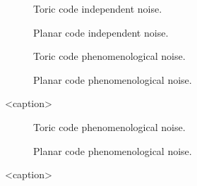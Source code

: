 \begin{figure}[htbp]
  \centering
  \begin{subfigure}[b]{0.49\textwidth}
      \begin{adjustbox}{Clip=0 1em 0 0}
        
      \end{adjustbox}
      \caption{Toric code independent noise.}
  \end{subfigure}
  \begin{subfigure}[b]{0.49\textwidth}
      \begin{adjustbox}{Clip=0 1em 0 0}
        
      \end{adjustbox}
      \caption{Planar code independent noise.}
  \end{subfigure}
  \begin{subfigure}[b]{0.49\textwidth}
      \begin{adjustbox}{Clip=0 1em 0 0}
        
      \end{adjustbox}
      \caption{Toric code phenomenological noise.}
  \end{subfigure}
  \begin{subfigure}[b]{0.49\textwidth}
      \begin{adjustbox}{Clip=0 1em 0 0}
        
      \end{adjustbox}
      \caption{Planar code phenomenological noise.}
  \end{subfigure}
  \caption{<caption>}
  \label{fig:mwcomp_uf}
\end{figure}

\begin{figure}[htbp]
  \centering
  \begin{subfigure}[b]{0.49\textwidth}
    \begin{adjustbox}{Clip=0 1em 0 0}
      
    \end{adjustbox}
    \caption{Toric code phenomenological noise.}
  \end{subfigure}
  \begin{subfigure}[b]{0.49\textwidth}
    \begin{adjustbox}{Clip=0 1em 0 0}
      
    \end{adjustbox}
    \caption{Planar code phenomenological noise.}
  \end{subfigure}
  \caption{<caption>}
  \label{fig:tcomp_uf_3d}
\end{figure}



